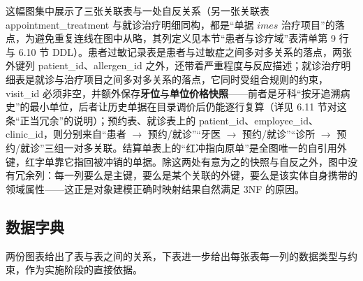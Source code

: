 \documentclass[11pt,a4paper]{ctexart}
\newcommand{\figtag}[1]{%
  \tikz[baseline=-0.35ex]{\node[fill=adcblue!90,text=white,rounded corners=1.5pt,
    inner xsep=5pt,inner ysep=1.2pt,font=\scriptsize\bfseries]{#1};}\hspace{2pt}}
\begin{document}
\figtag{图 12 说明} 这幅图集中展示了三张关联表与一处自反关系（另一张关联表 appointment\_treatment 与就诊治疗明细同构，都是“单据 $	imes$ 治疗项目”的落点，为避免重复连线在图中从略，其列定义见本节“患者与诊疗域”表清单第 9 行与 6.10 节 DDL）。患者过敏记录表是患者与过敏症之间多对多关系的落点，两张外键列 patient\_id、allergen\_id 之外，还带着严重程度与反应描述；就诊治疗明细表是就诊与治疗项目之间多对多关系的落点，它同时受组合规则的约束，visit\_id 必须非空，并额外保存\textbf{牙位}与\textbf{单位价格快照}——前者是牙科“按牙追溯病史”的最小单位，后者让历史单据在目录调价后仍能逐行复算（详见 6.11 节对这条“正当冗余”的说明）；预约表、就诊表上的 patient\_id、employee\_id、clinic\_id，则分别来自“患者 $\rightarrow$ 预约/就诊”“牙医 $\rightarrow$ 预约/就诊”“诊所 $\rightarrow$ 预约/就诊”三组一对多关联。结算单表上的“红冲指向原单”是全图唯一的自引用外键，红字单靠它指回被冲销的单据。除这两处有意为之的快照与自反之外，图中没有冗余列：每一列要么是主键，要么是某个关联的外键，要么是该实体自身携带的领域属性——这正是对象建模正确时映射结果自然满足 3NF 的原因。
\subsection{数据字典}

两份图表给出了表与表之间的关系，下表进一步给出每张表每一列的数据类型与约束，作为实施阶段的直接依据。
\end{document}
